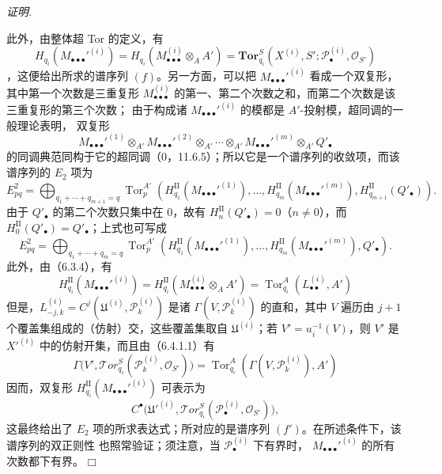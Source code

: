 \documentclass[UTF8,fontset=none,11pt,oneside,openany]{ctexbook}
\providecommand{\square}{\mdlgwhtsquare}
\newenvironment{proof}{%
  \par\smallskip\noindent\textit{证明.}\ %
}{\hfill$\square$\par}
\newcommand{\oldpage}[2][]{%
  \hypertarget{ega-source-page-#1-#2}{}%
  \marginnote{\scriptsize\textbf{#1}~|~#2}\ignorespaces}
\begin{document}
\begin{proof}
\oldpage[III]{168}
此外，由整体超 Tor 的定义，有
\[
  H_{q_i}(M_{\bullet\bullet\bullet}'^{(i)})
  =H_{q_i}(M_{\bullet\bullet\bullet}^{(i)}\otimes_A A')
  =\mathbf{Tor}_{q_i}^S
  (X^{(i)},S';\mathscr P_\bullet^{(i)},\mathscr O_{S'})
\]
，这便给出所求的谱序列 $(f)$。另一方面，可以把
$M_{\bullet\bullet\bullet}'^{(i)}$ 看成一个双复形，其中第一个次数是三重复形
$M_{\bullet\bullet\bullet}^{(i)}$ 的第一、第二个次数之和，而第二个次数是该三重复形的第三个次数；
由于构成诸 $M_{\bullet\bullet\bullet}'^{(i)}$ 的模都是 $A'$-投射模，超同调的一般理论表明，
双复形
\[
  M_{\bullet\bullet\bullet}'^{(1)}\otimes_{A'}
  M_{\bullet\bullet\bullet}'^{(2)}\otimes_{A'}\cdots\otimes_{A'}
  M_{\bullet\bullet\bullet}'^{(m)}\otimes_{A'} Q'_\bullet
\]
的同调典范同构于它的超同调（0，11.6.5）；所以它是一个谱序列的收敛项，而该谱序列的
$E_2$ 项为
\[
  E_{pq}^2
  =\bigoplus_{q_1+\cdots+q_{m+1}=q}
  \operatorname{Tor}_p^{A'}
  (H_{q_1}^{\mathrm{II}}(M_{\bullet\bullet\bullet}'^{(1)}),\ldots,
   H_{q_m}^{\mathrm{II}}(M_{\bullet\bullet\bullet}'^{(m)}),
   H_{q_{m+1}}^{\mathrm{II}}(Q'_\bullet)).
\]
由于 $Q'_\bullet$ 的第二个次数只集中在 $0$，故有
$H_n^{\mathrm{II}}(Q'_\bullet)=0$（$n\ne0$），而
$H_0^{\mathrm{II}}(Q'_\bullet)=Q'_\bullet$；上式也可写成
\[
  E_{pq}^2
  =\bigoplus_{q_1+\cdots+q_m=q}
  \operatorname{Tor}_p^{A'}
  (H_{q_1}^{\mathrm{II}}(M_{\bullet\bullet\bullet}'^{(1)}),\ldots,
   H_{q_m}^{\mathrm{II}}(M_{\bullet\bullet\bullet}'^{(m)}),Q'_\bullet).
\]
此外，由（6.3.4），有
\[
  H_{q_i}^{\mathrm{II}}(M_{\bullet\bullet\bullet}'^{(i)})
  =H_{q_i}^{\mathrm{II}}(M_{\bullet\bullet\bullet}^{(i)}\otimes_A A')
  =\operatorname{Tor}_{q_i}^A(L_{\bullet\bullet}^{(i)},A')
\]
但是，$L_{-j,k}^{(i)}=C^j(\mathfrak U^{(i)},\mathscr P_k^{(i)})$ 是诸
$\Gamma(V,\mathscr P_k^{(i)})$ 的直和，其中 $V$ 遍历由
$j+1$ 个覆盖集组成的（仿射）交，这些覆盖集取自 $\mathfrak U^{(i)}$；若
$V'=u_i^{-1}(V)$，则 $V'$ 是 $X'^{(i)}$ 中的仿射开集，而且由（6.4.1.1）有
\[
  \Gamma\bigl(V',\mathscr{T}\!or_{q_i}^S
  (\mathscr P_k^{(i)},\mathscr O_{S'})\bigr)
  =\operatorname{Tor}_{q_i}^A(\Gamma(V,\mathscr P_k^{(i)}),A')
\]
因而，双复形 $H_{q_i}^{\mathrm{II}}(M_{\bullet\bullet\bullet}'^{(i)})$ 可表示为
\[
  C^\bullet\bigl(\mathfrak U'^{(i)},
  \mathscr{T}\!or_{q_i}^S(\mathscr P_\bullet^{(i)},\mathscr O_{S'})\bigr),
\]
这最终给出了 $E_2$ 项的所求表达式；所对应的是谱序列 $(f')$。在所述条件下，该谱序列的双正则性
也照常验证；须注意，当 $\mathscr P_\bullet^{(i)}$ 下有界时，
$M_{\bullet\bullet\bullet}'^{(i)}$ 的所有次数都下有界。
\end{proof}
\end{document}
